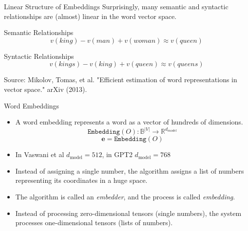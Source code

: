 \documentclass[aspectratio=169]{beamer}
\begin{document}
\begin{frame}{Linear Structure of Embeddings}
	Surprisingly, many semantic and syntactic relationships are (almost) linear in the word vector space.
	
	\begin{block}{Semantic Relationships}
		$$v(king) - v(man) + v(woman) \approx v(queen)$$
		\tiny
	\end{block}
	
	\begin{block}{Syntactic Relationships}
		$$v(kings) - v(king) + v(queen) \approx v(queens)$$
		\tiny
	\end{block}
	
	\vfill
	\tiny Source: Mikolov, Tomas, et al. "Efficient estimation of word representations in vector space." arXiv (2013).
\end{frame}

\begin{frame}{Word Embeddings}
	\begin{itemize}
		\item A word embedding represents a word as a vector of hundreds of dimensions.
		\begin{equation}
			\texttt{Embedding}(O):\mathbb{B}^{|V|} \rightarrow \mathbb{R}^{d_{model}}
		\end{equation}
		\begin{equation}
			\textbf{e} = \texttt{Embedding}(O)
		\end{equation}
	\item In Vaswani et al $d_{\text{model}} = 512$, in GPT2 $d_{\text{model}} = 768$
		\item Instead of assigning a single number, the algorithm assigns a list of numbers representing its coordinates in a huge space.
		\item The algorithm is called an \textit{embedder}, and the process is called \textit{embedding}.
		\item Instead of processing zero-dimensional tensors (single numbers), the system processes one-dimensional tensors (lists of numbers).
	\end{itemize}
\end{frame}
\end{document}
